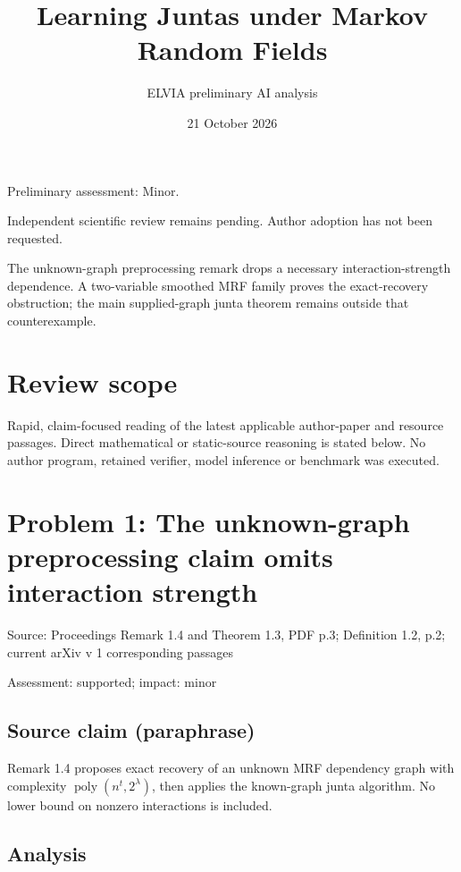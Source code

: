 \documentclass[11pt]{article}
\begin{document}
\title{Learning Juntas under Markov Random Fields}

\author{ELVIA preliminary AI analysis}\date{21 October 2026}\maketitle

Preliminary assessment: Minor.\par

Independent scientific review remains pending. Author adoption has not been requested.

The unknown-graph preprocessing remark drops a necessary interaction-strength dependence. A two-variable smoothed MRF family proves the exact-recovery obstruction; the main supplied-graph junta theorem remains outside that counterexample.

\section*{Review scope}

Rapid, claim-focused reading of the latest applicable author-paper and resource passages. Direct mathematical or static-source reasoning is stated below. No author program, retained verifier, model inference or benchmark was executed.

\section*{Problem 1: The unknown-graph preprocessing claim omits interaction strength}

Source: Proceedings Remark 1.4 and Theorem 1.3, PDF p.3; Definition 1.2, p.2; current arXiv v 1 corresponding passages

Assessment: supported; impact: minor

\subsection*{Source claim (paraphrase)}

Remark 1.4 proposes exact recovery of an unknown MRF dependency graph with complexity \(\operatorname{poly}(n^t,2^\lambda)\), then applies the known-graph junta algorithm. No lower bound on nonzero interactions is included.

\subsection*{Analysis}
\end{document}

